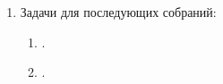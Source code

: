 \begin{enumerate}
\begin{enumerate}
		\item .
		
	\end{enumerate}
	
	\item Задачи для последующих собраний:
	\begin{enumerate}
		\item .
		
		\item .
		
	\end{enumerate}     
\end{enumerate}

\fillpage

